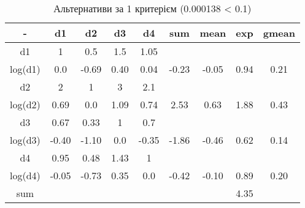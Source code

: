 \begin{table}[!ht]
    \centering
    \caption{Альтернативи за 1 критерієм (0.000138 < 0.1)}
    \label{tab:alternative_priorities1}

    \begin{tabular}{|c||c|c|c|c||c|c|c||c|}
        \toprule
        -       & d1    & d2    & d3   & d4    & sum   & mean  & exp  & gmean \\

        \midrule
        d1      & 1     & 0.5   & 1.5  & 1.05  &       &       &      &       \\
        log(d1) & 0.0   & -0.69 & 0.40 & 0.04  & -0.23 & -0.05 & 0.94 & 0.21  \\
        \hline
        d2      & 2     & 1     & 3    & 2.1   &       &       &      &       \\
        log(d2) & 0.69  & 0.0   & 1.09 & 0.74  & 2.53  & 0.63  & 1.88 & 0.43  \\
        \hline
        d3      & 0.67  & 0.33  & 1    & 0.7   &       &       &      &       \\
        log(d3) & -0.40 & -1.10 & 0.0  & -0.35 & -1.86 & -0.46 & 0.62 & 0.14  \\
        \hline
        d4      & 0.95  & 0.48  & 1.43 & 1     &       &       &      &       \\
        log(d4) & -0.05 & -0.73 & 0.35 & 0.0   & -0.42 & -0.10 & 0.89 & 0.20  \\

        \bottomrule
        sum     &       &       &      &       &       &       & 4.35 &       \\
        \hline
    \end{tabular}
\end{table}

